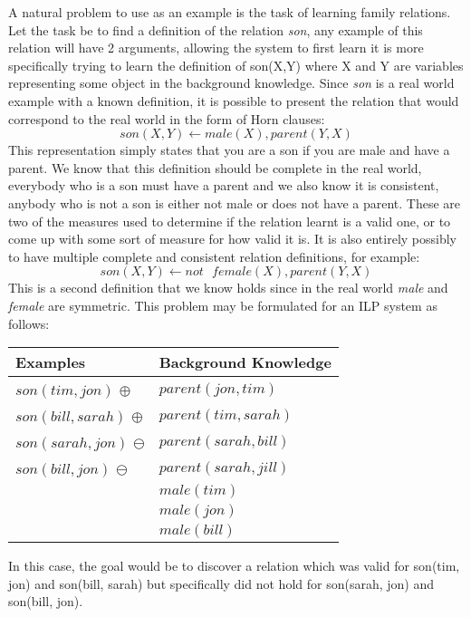 \documentclass{article}
\begin{document}
A natural problem to use as an example is the task of learning family
relations. Let the task be to find a definition of the relation {\it son},
any example of this relation will have 2 arguments, allowing the system to
first learn it is more specifically trying to learn the definition of
{son(X,Y)} where X and Y are variables representing some object in the
background knowledge. Since {\it son} is a real world example with a known
definition, it is possible to present the relation that would correspond to the
real world in the form of Horn clauses:
$$ son(X,Y) \leftarrow male(X), parent(Y,X) $$
This representation simply states that you are a son if you are male and have a
parent. We know that this definition should be complete in the real world,
everybody who is a son must have a parent and we also know it is consistent,
anybody who is not a son is either not male or does not have a parent. These
are two of the measures used to determine if the relation learnt is a valid
one, or to come up with some sort of measure for how valid it is. It is also
entirely possibly to have multiple complete and consistent relation
definitions, for example:
$$ son(X,Y) \leftarrow not\mbox{ }female(X), parent(Y,X) $$
This is a second definition that we know holds since in the real world {\it
male} and {\it female} are symmetric.
This problem may be formulated for an ILP system as follows:
\begin{center}
\begin{tabular}{| l | l |}
    \hline
    Examples & Background Knowledge \\
    \hline
    $son(tim, jon)$ $\oplus$ & $parent(jon, tim)$ \\
    $son(bill, sarah)$ $\oplus$ & $parent(tim, sarah)$ \\
    $son(sarah, jon)$ $\ominus$ & $parent(sarah, bill)$ \\
    $son(bill, jon)$ $\ominus$ & $parent(sarah, jill)$ \\
    & $male(tim)$ \\
    & $male(jon)$ \\
    & $male(bill)$ \\
\hline
\end{tabular}
\end{center}

In this case, the goal would be to discover a relation which was valid for
son(tim, jon) and son(bill, sarah) but specifically did not hold for son(sarah,
jon) and son(bill, jon).
\end{document}
